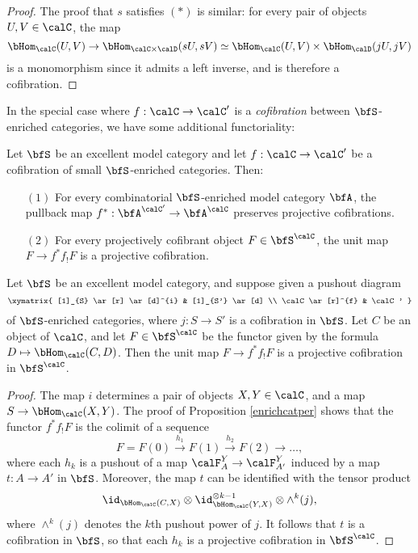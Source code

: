 \begin{Simplicial Categories}
\begin{proof}
The proof that $s$ satisfies $(\ast)$ is similar: for every pair of objects $U,V \in \calC$,
the map $$ \bHom_{\calC}(U,V) \rightarrow \bHom_{ \calC \times \calD}( sU, sV)
\simeq \bHom_{ \calC}( U,V) \times \bHom_{\calD}(jU,jV)$$
is a monomorphism since it admits a left inverse, and is therefore a cofibration.
\end{proof}

In the special case where $f: \calC \rightarrow \calC'$ is a {\em cofibration} between
$\bfS$-enriched categories, we have some additional functoriality:

\begin{proposition}\label{sumner}
Let $\bfS$ be an excellent model category and let $f: \calC \rightarrow \calC'$ be a cofibration
of small $\bfS$-enriched categories. Then:
\begin{itemize}

\item[$(1)$] For every combinatorial $\bfS$-enriched model category $\bfA$, the pullback map
$f^{\ast}: \bfA^{\calC'} \rightarrow \bfA^{\calC}$ preserves projective cofibrations. 

\item[$(2)$] For every projectively cofibrant object $F \in \bfS^{\calC}$, the
unit map $F \rightarrow f^{\ast} f_{!} F$ is a projective cofibration.

\end{itemize}
\end{proposition}

\begin{lemma}\label{pseudopod}
Let $\bfS$ be an excellent model category, and suppose given a pushout diagram
$$ \xymatrix{ [1]_{S} \ar[r] \ar[d]^{i} & [1]_{S'} \ar[d] \\
\calC \ar[r]^{f} & \calC' }$$
of $\bfS$-enriched categories, where $j: S \rightarrow S'$ is a cofibration in $\bfS$.
Let $C$ be an object of $\calC$, and let $F \in \bfS^{\calC}$ be the functor
given by the formula $D \mapsto \bHom_{\calC}(C, D)$. Then
the unit map $F \rightarrow f^{\ast} f_{!} F$ is a projective cofibration in
$\bfS^{\calC}$.
\end{lemma}

\begin{proof}
The map $i$ determines a pair of objects $X,Y \in \calC$, and a map
$S \rightarrow \bHom_{\calC}(X,Y)$. The proof of Proposition \ref{enrichcatper}
shows that the functor $f^{\ast} f_{!} F$ is the colimit of a sequence
$$F = F(0) \stackrel{h_1}{\rightarrow} F(1) \stackrel{h_2}{\rightarrow} F(2) \rightarrow \ldots,$$
where each $h_k$ is a pushout of a map 
$\calF^{Y}_{A} \rightarrow \calF^{Y}_{A'}$ induced by a map
$t: A \rightarrow A'$ in $\bfS$. Moreover, the map
$t$ can be identified with the tensor product 
$$\id_{ \bHom_{\calC}(C, X)} \otimes \id_{ \bHom_{\calC}(Y,X) }^{\otimes k-1}
\otimes \wedge^{k}(j),$$ 
where $\wedge^{k}(j)$ denotes the $k$th pushout power of $j$. 
It follows that $t$ is a cofibration in $\bfS$, so that each $h_k$ is a projective cofibration
in $\bfS^{\calC}$. 
\end{proof}


\end{Simplicial Categories}
